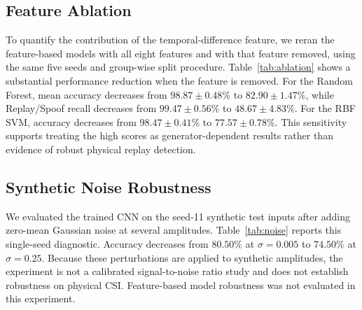 \documentclass[conference]{IEEEtran}
\begin{document}
\subsection{Feature Ablation}
To quantify the contribution of the temporal-difference feature, we reran the feature-based models with all eight features and with that feature removed, using the same five seeds and group-wise split procedure. Table~\ref{tab:ablation} shows a substantial performance reduction when the feature is removed. For the Random Forest, mean accuracy decreases from $98.87\pm0.48\%$ to $82.90\pm1.47\%$, while Replay/Spoof recall decreases from $99.47\pm0.56\%$ to $48.67\pm4.83\%$. For the RBF SVM, accuracy decreases from $98.47\pm0.41\%$ to $77.57\pm0.78\%$. This sensitivity supports treating the high scores as generator-dependent results rather than evidence of robust physical replay detection.

\begin{table}[t]
\caption{Five-Seed Feature Ablation Results (Mean $\pm$ Standard Deviation)}
\label{tab:ablation}
\centering
\scriptsize
\setlength{\tabcolsep}{2pt}
\end{table}

\subsection{Synthetic Noise Robustness}
We evaluated the trained CNN on the seed-11 synthetic test inputs after adding zero-mean Gaussian noise at several amplitudes. Table~\ref{tab:noise} reports this single-seed diagnostic. Accuracy decreases from $80.50\%$ at $\sigma=0.005$ to $74.50\%$ at $\sigma=0.25$. Because these perturbations are applied to synthetic amplitudes, the experiment is not a calibrated signal-to-noise ratio study and does not establish robustness on physical CSI. Feature-based model robustness was not evaluated in this experiment.
\end{document}
